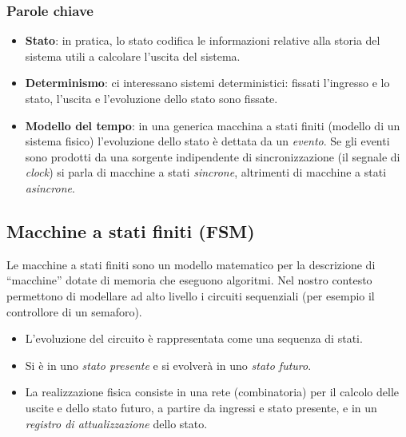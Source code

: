 \documentclass[11pt,a4paper]{article}
\begin{document}
\subsubsection{Parole chiave}

\begin{itemize}
    \item \textbf{Stato}: in pratica, lo stato codifica le informazioni relative alla storia del sistema utili a calcolare l'uscita del sistema.
    \item \textbf{Determinismo}: ci interessano sistemi deterministici: fissati l'ingresso e lo stato, l'uscita e l'evoluzione dello stato sono fissate.
    \item \textbf{Modello del tempo}: in una generica macchina a stati finiti (modello di un sistema fisico) l'evoluzione dello stato è dettata da un \emph{evento}. Se gli eventi sono prodotti da una sorgente indipendente di sincronizzazione (il segnale di \emph{clock}) si parla di macchine a stati \emph{sincrone}, altrimenti di macchine a stati \emph{asincrone}.
\end{itemize}

\subsection{Macchine a stati finiti (FSM)}

Le macchine a stati finiti sono un modello matematico per la descrizione di ``macchine'' dotate di memoria che eseguono algoritmi. Nel nostro contesto permettono di modellare ad alto livello i circuiti sequenziali (per esempio il controllore di un semaforo).
\begin{itemize}
    \item L'evoluzione del circuito è rappresentata come una sequenza di stati.
    \item Si è in uno \emph{stato presente} e si evolverà in uno \emph{stato futuro}.
    \item La realizzazione fisica consiste in una rete (combinatoria) per il calcolo delle uscite e dello stato futuro, a partire da ingressi e stato presente, e in un \emph{registro di attualizzazione} dello stato.
\end{itemize}
\end{document}
